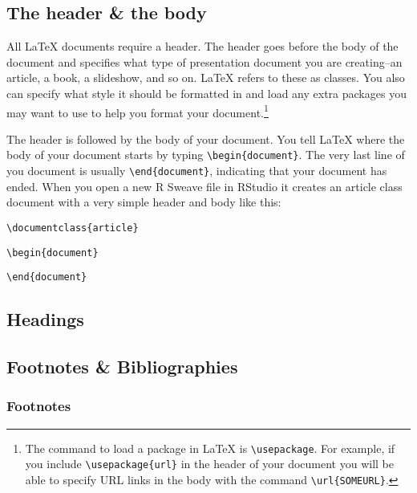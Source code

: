 \subsection{The header \& the body}

All LaTeX documents require a header. The header goes before the body of the document and specifies what type of presentation document you are creating--an article, a book, a slideshow, and so on. LaTeX refers to these as classes. You also can specify what style it should be formatted in and load any extra packages you may want to use to help you format your document.\footnote{The command to load a package in LaTeX is \texttt{\textbackslash{}usepackage}. For example, if you include \texttt{\textbackslash{}usepackage\{url\}} in the header of your document you will be able to specify URL links in the body with the command \texttt{\textbackslash{}url\{SOMEURL\}}.}

The header is followed by the body of your document. You tell LaTeX where the body of your document starts by typing \texttt{\textbackslash{}begin\{document\}}. The very last line of you document is usually \texttt{\textbackslash{}end\{document\}}, indicating that your document has ended. When you open a new R Sweave file in RStudio it creates an article class document with a very simple header and body like this:

\begin{knitrout}
\color{fgcolor}\begin{kframe}
\begin{alltt}
\textbackslash{}documentclass\{article\}

\textbackslash{}begin\{document\}


\textbackslash{}end\{document\}
\end{alltt}
\end{kframe}
\end{knitrout}


\subsection{Headings}

\subsection{Footnotes \& Bibliographies}

\subsubsection{Footnotes}

